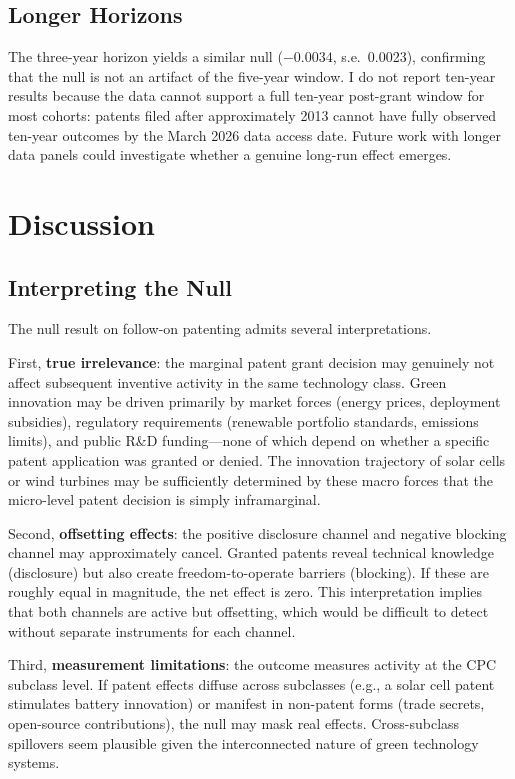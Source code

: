 \documentclass[12pt]{article}
\begin{document}
\subsection{Longer Horizons}
\label{sec:tenyear}

The three-year horizon yields a similar null ($-0.0034$, s.e.\ 0.0023), confirming that the null is not an artifact of the five-year window. I do not report ten-year results because the data cannot support a full ten-year post-grant window for most cohorts: patents filed after approximately 2013 cannot have fully observed ten-year outcomes by the March 2026 data access date. Future work with longer data panels could investigate whether a genuine long-run effect emerges.


\section{Discussion}

\subsection{Interpreting the Null}

The null result on follow-on patenting admits several interpretations.

First, \textbf{true irrelevance}: the marginal patent grant decision may genuinely not affect subsequent inventive activity in the same technology class. Green innovation may be driven primarily by market forces (energy prices, deployment subsidies), regulatory requirements (renewable portfolio standards, emissions limits), and public R\&D funding---none of which depend on whether a specific patent application was granted or denied. The innovation trajectory of solar cells or wind turbines may be sufficiently determined by these macro forces that the micro-level patent decision is simply inframarginal.

Second, \textbf{offsetting effects}: the positive disclosure channel and negative blocking channel may approximately cancel. Granted patents reveal technical knowledge (disclosure) but also create freedom-to-operate barriers (blocking). If these are roughly equal in magnitude, the net effect is zero. This interpretation implies that both channels are active but offsetting, which would be difficult to detect without separate instruments for each channel.

Third, \textbf{measurement limitations}: the outcome measures activity at the CPC subclass level. If patent effects diffuse across subclasses (e.g., a solar cell patent stimulates battery innovation) or manifest in non-patent forms (trade secrets, open-source contributions), the null may mask real effects. Cross-subclass spillovers seem plausible given the interconnected nature of green technology systems.
\end{document}
